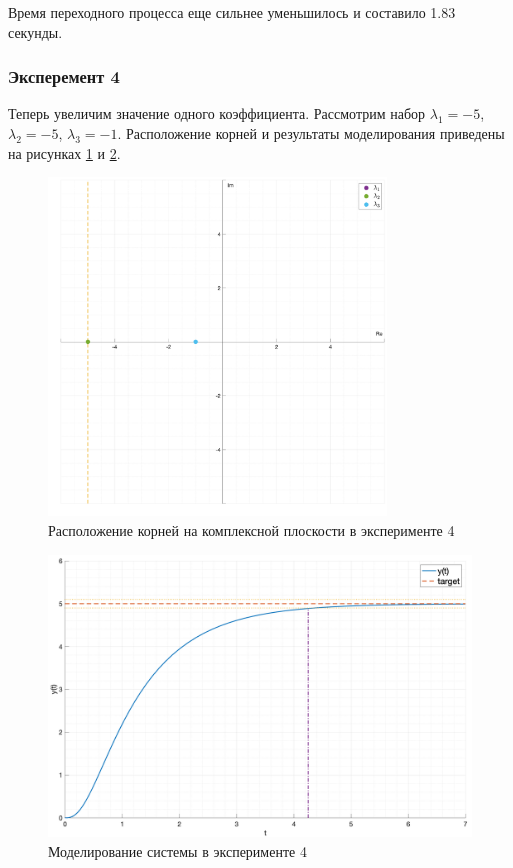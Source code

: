 Время переходного процесса еще сильнее уменьшилось и составило 1.83 секунды. 

\subsubsection{Эксперемент 4}
\label{task2_case4}
Теперь увеличим значение одного коэффициента. Рассмотрим набор 
$\lambda_1 = -5$, $\lambda_2 = -5$, $\lambda_3 = -1$. 
Расположение корней и результаты моделирования приведены на рисунках 
\ref{fig:task_2_points4} и \ref{fig:task_2_case4}.

\begin{figure}
    \centering
    \includegraphics[width=0.8\textwidth]{media/plots/task2_points4.png}
    \caption{Расположение корней на комплексной плоскости в эксперименте 4}
    \label{fig:task_2_points4}
\end{figure}

\begin{figure}
    \centering
    \includegraphics[width=\textwidth]{media/plots/task2_case4.png}
    \caption{Моделирование системы в эксперименте 4}
    \label{fig:task_2_case4}
\end{figure}

